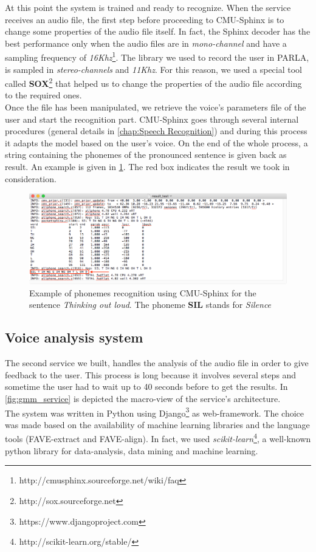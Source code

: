 \noindent At this point the system is trained and ready to recognize. When the service receives an audio file, the first step before proceeding to CMU-Sphinx is to change some properties of the audio file itself. In fact, the Sphinx decoder has the best performance only when the audio files are in \textit{mono-channel} and have a sampling frequency of \textit{16Khz}\footnote{http://cmusphinx.sourceforge.net/wiki/faq}. The library we used to record the user in PARLA, is sampled in \textit{stereo-channels} and \textit{11Khz}. For this reason, we used a special tool called \textbf{SOX}\footnote{http://sox.sourceforge.net} that helped us to change the properties of the audio file according to the required ones. \\

\noindent Once the file has been manipulated, we retrieve the voice's parameters file of the user and start the recognition part. CMU-Sphinx goes through several internal procedures (general details in \ref{chap:Speech Recognition}) and during this process it adapts the model based on the user's voice. On the end of the whole process, a string containing the phonemes of the pronounced sentence is given back as result. An example is given in \ref{fig:result_sphinx}. The red box indicates the result we took in consideration.

\begin{figure}[!ht]
	\centering
	\includegraphics[scale=0.5]{Figures/result_sphinx.png}
	\caption{Example of phonemes recognition using CMU-Sphinx for the sentence \textit{Thinking out loud}. The phoneme \textbf{SIL} stands for \textit{Silence}}
	\label{fig:result_sphinx}
\end{figure}

\subsection{Voice analysis system}
\label{ssec:training_gmm}

The second service we built, handles the analysis of the audio file in order to give feedback to the user. This process is long because it involves several steps and sometime the user had to wait up to 40 seconds before to get the results. In \ref{fig:gmm_service} is depicted the macro-view of the service's architecture. \\
\noindent The system was written in Python using Django\footnote{https://www.djangoproject.com} as web-framework. The choice was made based on the availability of machine learning libraries and the language tools (FAVE-extract and FAVE-align). In fact, we used \textit{scikit-learn}\footnote{http://scikit-learn.org/stable/}, a well-known python library for data-analysis, data mining and machine learning. \\

